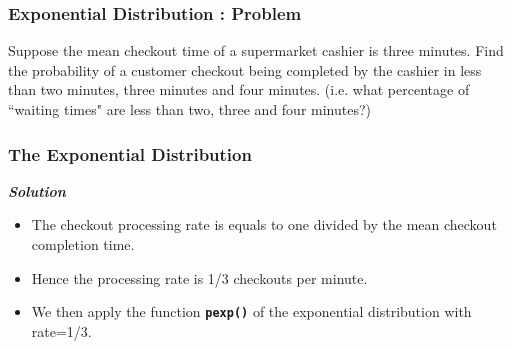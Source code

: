 \documentclass[MAIN.tex]{subfiles}
\begin{document}
%
%
%
%
%
\begin{frame}[fragile]
	\frametitle{Exponential Distribution : Problem}
	\large

Suppose the mean checkout time of a supermarket cashier is three minutes. Find the probability of a customer checkout being completed by the cashier in less than two minutes, three minutes and four minutes. 
(i.e. what percentage of ``waiting times" are less than two, three and four minutes?)
\end{frame}
\begin{frame}[fragile]
	\frametitle{The Exponential Distribution}
	\large
\textbf{\emph{Solution}} 
\begin{itemize}
\item The checkout processing rate is equals to one divided by the mean checkout completion time. 
\item Hence the processing rate is 1/3 checkouts per minute. 
\item We then apply the function \texttt{\textbf{pexp()}} of the exponential distribution with rate=1/3.
\end{itemize} 
\end{frame}
\end{document}
